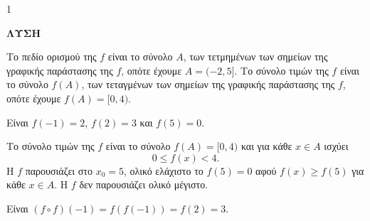 \begin{ylh}{1}
    \item [Ύλη από εικόνα]
\end{ylh}
\noindent\textbf{ΛΥΣΗ}

\begin{alist}
\item Το πεδίο ορισμού της $f$ είναι το σύνολο $A$, των τετμημένων των σημείων της γραφικής παράστασης της $f$, οπότε έχουμε $A = (-2, 5]$.
Το σύνολο τιμών της $f$ είναι το σύνολο $f(A)$, των τεταγμένων των σημείων της γραφικής παράστασης της $f$, οπότε έχουμε $f(A) = [0, 4)$.
\item Είναι $f(-1) = 2$, $f(2) = 3$ και $f(5) = 0$.
\item Το σύνολο τιμών της $f$ είναι το σύνολο $f(A) = [0, 4)$ και για κάθε $x \in A$ ισχύει
\[ 0 \le f(x) < 4. \]
Η $f$ παρουσιάζει στο $x_0 = 5$, ολικό ελάχιστο το $f(5) = 0$ αφού $f(x) \ge f(5)$ για κάθε $x \in A$.
Η $f$ δεν παρουσιάζει ολικό μέγιστο.
\item Είναι $(f \circ f)(-1) = f(f(-1)) = f(2) = 3$.
\end{alist}